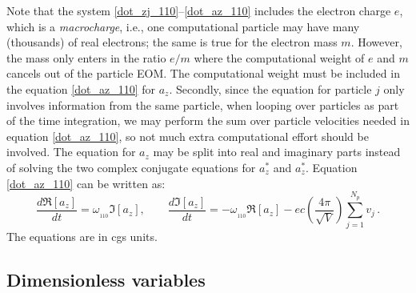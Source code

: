 \documentclass[11pt]{article}
\begin{document}
Note that the system \eqref{dot_zj_110}--\eqref{dot_az_110} includes the electron charge $e$, which is a 
\textit{macrocharge}, i.e., one computational particle may have many (thousands) of real electrons; 
the same is true for the electron mass $m$. However, the mass only enters in the ratio $e/m$ where the
computational weight of $e$ and $m$ cancels out of the particle EOM. The computational weight must
be included in the equation \eqref{dot_az_110} for $a_z$.
Secondly, since the equation for particle $j$ only involves information from the same particle, when
looping over particles as part of the time integration, we may perform the sum over particle velocities needed in
equation \eqref{dot_az_110}, so not much extra computational effort should be involved.
The equation for $a_z$ may be split into real and imaginary parts instead of solving the two complex
conjugate equations for $a_z^*$ and $a_z^*$. 
Equation \eqref{dot_az_110} can be written as:
%
\begin{equation}
\frac{d\Re[{a}_z]}{dt} = \omega_{_{110}}\Im[a_z], \qquad 
\frac{d\Im[{a}_z]}{dt} = -\omega_{_{110}}\Re[a_z] - ec\left(\frac{4\pi}{\sqrt{V}}\right) \sum_{j=1}^{N_p}v_j\, .
\label{dot_az_Re_Im}
\end{equation}
%
The equations are in cgs units.

\newpage
\subsection{Dimensionless variables}
\label{Dimensionless}
\end{document}
